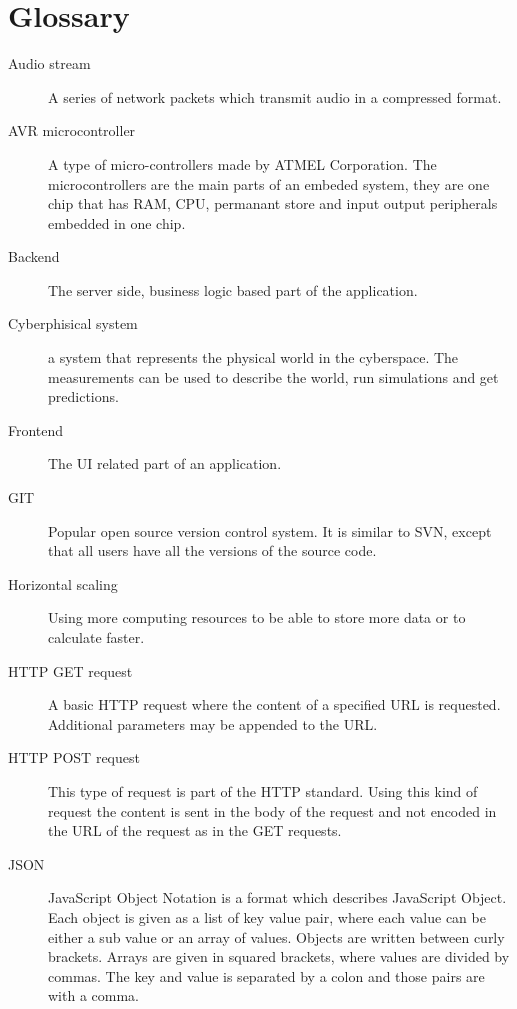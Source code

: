 \section{Glossary}
\begin{description}
	\item[Audio stream] A series of network packets which transmit audio in a compressed format.
	
	\item[AVR microcontroller] A type of micro-controllers made by ATMEL Corporation. The microcontrollers are the main parts of an embeded system, they are one chip that has RAM, CPU, permanant store and input output peripherals embedded in one chip.
	
	\item[Backend] The server side, business logic based part of the application.
	
	\item[Cyberphisical system] a system that represents the physical world in the cyberspace. The measurements can be used to describe the world, run simulations and get predictions.
	
	\item[Frontend] The UI related part of an application.
	
	\item[GIT] Popular open source version control system. It is similar to SVN, except that all users have all the versions of the source code.
	
	\item[Horizontal scaling] Using more computing resources to be able to store more data or to calculate faster.
	
	\item[HTTP GET request] A basic HTTP request where the content of a specified URL is requested. Additional parameters may be appended to the URL.
	
	\item[HTTP POST request] This type of request is part of the HTTP standard. Using this kind of request the content is sent in the body of the request and not encoded in the URL of the request as in the GET requests.
	
	\item[JSON] JavaScript Object Notation is a format which describes JavaScript Object. Each object is given as a list of key value pair, where each value can be either a sub value or an array of values. Objects are written between curly brackets. Arrays are given in squared brackets, where values are divided by commas. The key and value is separated by a colon and those pairs are with a comma.
	

\end{description}

